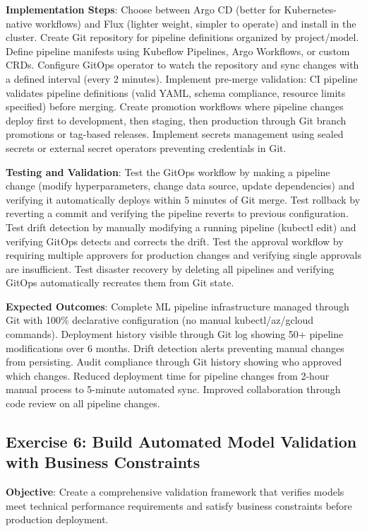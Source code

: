 \textbf{Implementation Steps}: Choose between Argo CD (better for Kubernetes-native workflows) and Flux (lighter weight, simpler to operate) and install in the cluster. Create Git repository for pipeline definitions organized by project/model. Define pipeline manifests using Kubeflow Pipelines, Argo Workflows, or custom CRDs. Configure GitOps operator to watch the repository and sync changes with a defined interval (every 2 minutes). Implement pre-merge validation: CI pipeline validates pipeline definitions (valid YAML, schema compliance, resource limits specified) before merging. Create promotion workflows where pipeline changes deploy first to development, then staging, then production through Git branch promotions or tag-based releases. Implement secrets management using sealed secrets or external secret operators preventing credentials in Git.

\textbf{Testing and Validation}: Test the GitOps workflow by making a pipeline change (modify hyperparameters, change data source, update dependencies) and verifying it automatically deploys within 5 minutes of Git merge. Test rollback by reverting a commit and verifying the pipeline reverts to previous configuration. Test drift detection by manually modifying a running pipeline (kubectl edit) and verifying GitOps detects and corrects the drift. Test the approval workflow by requiring multiple approvers for production changes and verifying single approvals are insufficient. Test disaster recovery by deleting all pipelines and verifying GitOps automatically recreates them from Git state.

\textbf{Expected Outcomes}: Complete ML pipeline infrastructure managed through Git with 100\% declarative configuration (no manual kubectl/az/gcloud commands). Deployment history visible through Git log showing 50+ pipeline modifications over 6 months. Drift detection alerts preventing manual changes from persisting. Audit compliance through Git history showing who approved which changes. Reduced deployment time for pipeline changes from 2-hour manual process to 5-minute automated sync. Improved collaboration through code review on all pipeline changes.

\subsection{Exercise 6: Build Automated Model Validation with Business Constraints}

\textbf{Objective}: Create a comprehensive validation framework that verifies models meet technical performance requirements and satisfy business constraints before production deployment.

